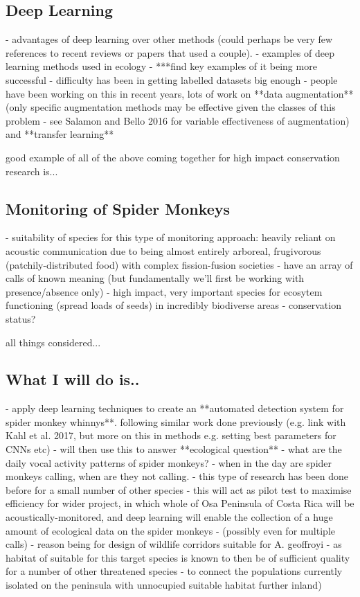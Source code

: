 \documentclass[11pt]{article}
\begin{document}
\subsection{Deep Learning}
- advantages of deep learning over other methods (could perhaps be very few references to recent reviews or papers that used a couple).  
- examples of deep learning methods used in ecology 
- ***find key examples of it being more successful
- difficulty has been in getting labelled datasets big enough
- people have been working on this in recent years, lots of work on **data augmentation** (only specific augmentation methods may be effective given the classes of this problem - see Salamon and Bello 2016 for variable effectiveness of augmentation) and **transfer learning**

good example of all of the above coming together for high impact conservation research is...

\subsection{Monitoring of Spider Monkeys}
- suitability of species for this type of monitoring approach: heavily reliant on acoustic communication due to being almost entirely arboreal, frugivorous (patchily-distributed food) with complex fission-fusion societies 
- have an array of calls of known meaning (but fundamentally we'll first be working with presence/absence only)
- high impact, very important species for ecosytem functioning (spread loads of seeds) in incredibly biodiverse areas
- conservation status?

all things considered...
\subsection{What I will do is..}

- apply deep learning techniques to create an **automated detection system for spider monkey whinnys**. following similar work done previously (e.g. link with Kahl et al. 2017, but more on this in methods e.g. setting best parameters for CNNs etc)
- will then use this to answer **ecological question** - what are the daily vocal activity patterns of spider monkeys? - when in the day are spider monkeys calling, when are they not calling. 
- this type of research has been done before for a small number of other species 
- this will act as pilot test to maximise efficiency for wider project, in which whole of Osa Peninsula of Costa Rica will be acoustically-monitored, and deep learning will enable the collection of a huge amount of ecological data on the spider monkeys
- (possibly even for multiple calls)
- reason being for design of wildlife corridors suitable for A. geoffroyi - as habitat of suitable for this target species is known to then be of sufficient quality for a number of other threatened species - to connect the populations currently isolated on the peninsula with unnocupied suitable habitat further inland)
\end{document}
